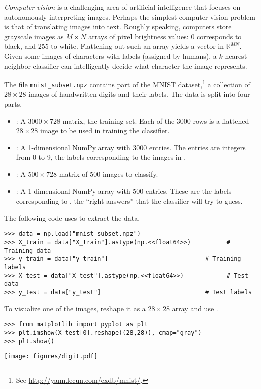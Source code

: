 \emph{Computer vision} is a challenging area of artificial intelligence that focuses on autonomously interpreting images.
Perhaps the simplest computer vision problem is that of translating images into text.
Roughly speaking, computers store grayscale images as $M \times N$ arrays of pixel brightness values: 0 corresponds to black, and 255 to white.
Flattening out such an array yields a vector in $\mathbb{R}^{MN}$.
Given some images of characters with labels (assigned by humans), a $k$-nearest neighbor classifier can intelligently decide what character the image represents.

\begin{problem}
The file \texttt{mnist\_subset.npz} contains part of the MNIST dataset,\footnote{See \url{http://yann.lecun.com/exdb/mnist/}.} a collection of $28\times 28$ images of handwritten digits and their labels.
The data is split into four parts.
\begin{itemize}
\item {}: A $3000\times 728$ matrix, the training set.
Each of the $3000$ rows is a flattened $28\times 28$ image to be used in training the classifier.

\item {}: A 1-dimensional NumPy array with $3000$ entries.
The entries are integers from 0 to 9, the labels corresponding to the images in .

\item {}: A $500\times 728$ matrix of $500$ images to classify.

\item {}: A 1-dimensional NumPy array with $500$ entries.
These are the labels corresponding to , the ``right answers'' that the classifier will try to guess.
\end{itemize}
The following code uses  to extract the data.
\begin{lstlisting}
>>> data = np.load("mnist_subset.npz")
>>> X_train = data["X_train"].astype(np.<<float64>>)          # Training data
>>> y_train = data["y_train"]                           # Training labels
>>> X_test = data["X_test"].astype(np.<<float64>>)            # Test data
>>> y_test = data["y_test"]                             # Test labels
\end{lstlisting}
To visualize one of the images, reshape it as a $28\times 28$ array and use .
\begin{lstlisting}
>>> from matplotlib import pyplot as plt
>>> plt.imshow(X_test[0].reshape((28,28)), cmap="gray")
>>> plt.show()
\end{lstlisting}
\begin{center}
\texttt{[image: figures/digit.pdf]}
\end{center}


\end{problem}
